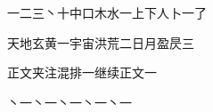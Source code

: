 \documentclass{ltc-guji}
\begin{document}
\begin{正文}

一二三丶十中口木水一上下人卜一了

天地玄黄一宇宙洪荒二日月盈昃三

正文夹注混排一继续正文一

丶一丶一丶一丶一丶一

\end{正文}
\end{document}
